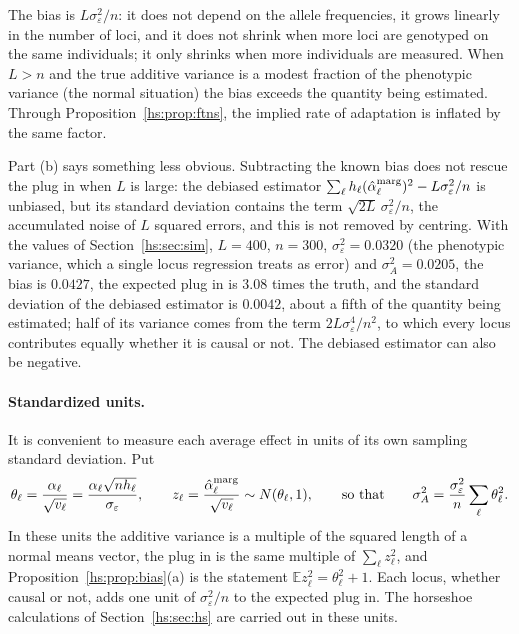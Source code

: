 The bias is $L\sigma^2_\varepsilon/n$: it does not depend on the allele frequencies, it grows linearly in the number of loci, and it does not shrink when more loci are genotyped on the same individuals; it only shrinks when more individuals are measured. When $L > n$ and the true additive variance is a modest fraction of the phenotypic variance (the normal situation) the bias exceeds the quantity being estimated. Through Proposition~\ref{hs:prop:ftns}, the implied rate of adaptation is inflated by the same factor.

Part (b) says something less obvious. Subtracting the known bias does not rescue the plug in when $L$ is large: the debiased estimator $\sum_\ell h_\ell(\hat\alpha^{\rm marg}_\ell)^2 - L\sigma^2_\varepsilon/n$ is unbiased, but its standard deviation contains the term $\sqrt{2L}\,\sigma^2_\varepsilon/n$, the accumulated noise of $L$ squared errors, and this is not removed by centring. With the values of Section~\ref{hs:sec:sim}, $L = 400$, $n = 300$, $\sigma^2_\varepsilon = 0.0320$ (the phenotypic variance, which a single locus regression treats as error) and $\sigma^2_A = 0.0205$, the bias is $0.0427$, the expected plug in is $3.08$ times the truth, and the standard deviation of the debiased estimator is $0.0042$, about a fifth of the quantity being estimated; half of its variance comes from the term $2L\sigma^4_\varepsilon/n^2$, to which every locus contributes equally whether it is causal or not. The debiased estimator can also be negative.

\paragraph{Standardized units.} It is convenient to measure each average effect in units of its own sampling standard deviation. Put
\[
\theta_\ell = \frac{\alpha_\ell}{\sqrt{v_\ell}} = \frac{\alpha_\ell\sqrt{n h_\ell}}{\sigma_\varepsilon},
\qquad
z_\ell = \frac{\hat\alpha^{\rm marg}_\ell}{\sqrt{v_\ell}} \sim N(\theta_\ell, 1),
\qquad\text{so that}\qquad
\sigma^2_A = \frac{\sigma^2_\varepsilon}{n}\sum_\ell \theta_\ell^2 .
\]
In these units the additive variance is a multiple of the squared length of a normal means vector, the plug in is the same multiple of $\sum_\ell z_\ell^2$, and Proposition~\ref{hs:prop:bias}(a) is the statement $\mathbb{E}z_\ell^2 = \theta_\ell^2 + 1$. Each locus, whether causal or not, adds one unit of $\sigma^2_\varepsilon/n$ to the expected plug in. The horseshoe calculations of Section~\ref{hs:sec:hs} are carried out in these units.

